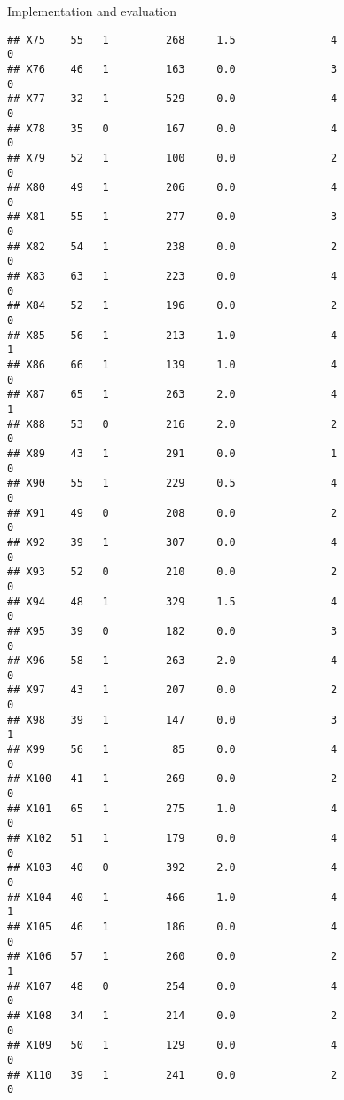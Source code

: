 \documentclass[
  ignorenonframetext,
]{beamer}
\begin{document}
\begin{frame}[fragile]{Implementation and evaluation}
\begin{verbatim}
## X75    55   1         268     1.5               4                   0
## X76    46   1         163     0.0               3                   0
## X77    32   1         529     0.0               4                   0
## X78    35   0         167     0.0               4                   0
## X79    52   1         100     0.0               2                   0
## X80    49   1         206     0.0               4                   0
## X81    55   1         277     0.0               3                   0
## X82    54   1         238     0.0               2                   0
## X83    63   1         223     0.0               4                   0
## X84    52   1         196     0.0               2                   0
## X85    56   1         213     1.0               4                   1
## X86    66   1         139     1.0               4                   0
## X87    65   1         263     2.0               4                   1
## X88    53   0         216     2.0               2                   0
## X89    43   1         291     0.0               1                   0
## X90    55   1         229     0.5               4                   0
## X91    49   0         208     0.0               2                   0
## X92    39   1         307     0.0               4                   0
## X93    52   0         210     0.0               2                   0
## X94    48   1         329     1.5               4                   0
## X95    39   0         182     0.0               3                   0
## X96    58   1         263     2.0               4                   0
## X97    43   1         207     0.0               2                   0
## X98    39   1         147     0.0               3                   1
## X99    56   1          85     0.0               4                   0
## X100   41   1         269     0.0               2                   0
## X101   65   1         275     1.0               4                   0
## X102   51   1         179     0.0               4                   0
## X103   40   0         392     2.0               4                   0
## X104   40   1         466     1.0               4                   1
## X105   46   1         186     0.0               4                   0
## X106   57   1         260     0.0               2                   1
## X107   48   0         254     0.0               4                   0
## X108   34   1         214     0.0               2                   0
## X109   50   1         129     0.0               4                   0
## X110   39   1         241     0.0               2                   0

\end{verbatim}
\end{frame}
\end{document}
